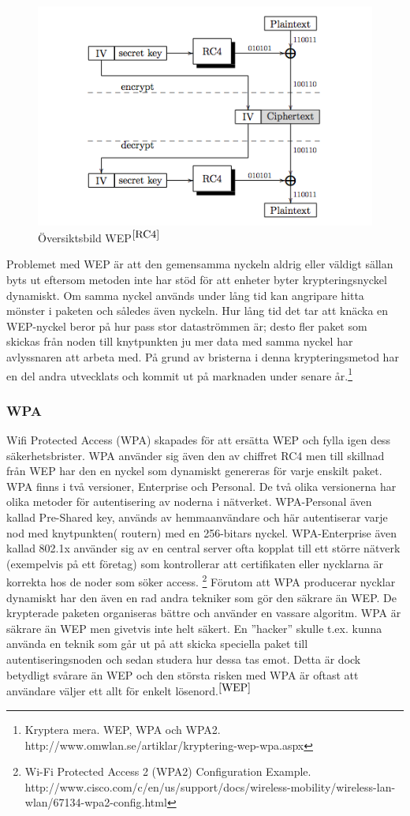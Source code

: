 \documentclass[a4paper,12pt,fleqn]{article}
\begin{document}
\begin{figure}[htp]
  \begin{center}
  \includegraphics[keepaspectratio=true,width=0.5\linewidth]{WEP}  %
  \caption{Översiktsbild WEP$^{\ref{RC4}}$} %
  \end{center}
  \label{fig:overview}
\end{figure}
\newpage
Problemet med WEP är att den gemensamma nyckeln aldrig eller väldigt sällan byts ut eftersom metoden inte har stöd för att enheter byter krypteringsnyckel dynamiskt. Om samma nyckel används under lång tid kan angripare hitta mönster i paketen och således även nyckeln. Hur lång tid det tar att knäcka en WEP-nyckel beror på hur pass stor dataströmmen är; desto fler paket som skickas från noden till knytpunkten ju mer data med samma nyckel har avlyssnaren att arbeta med. På grund av bristerna i denna krypteringsmetod har en del andra utvecklats och kommit ut på marknaden under senare år.\footnote{\label{WEP}Kryptera mera. WEP, WPA och WPA2. http://www.omwlan.se/artiklar/kryptering-wep-wpa.aspx }

\subsubsection{WPA}
Wifi Protected Access (WPA) skapades för att ersätta WEP och fylla igen dess säkerhetsbrister. WPA använder sig även den av chiffret RC4 men till skillnad från WEP har den en nyckel som dynamiskt genereras för varje enskilt paket. WPA finns i två versioner, Enterprise och Personal. De två olika versionerna har olika metoder för autentisering av noderna i nätverket. WPA-Personal även kallad Pre-Shared key, används av hemmaanvändare och här autentiserar varje nod med knytpunkten( routern) med en 256-bitars nyckel. WPA-Enterprise även kallad 802.1x använder sig av en central server ofta kopplat till ett större nätverk (exempelvis på ett företag) som kontrollerar att certifikaten eller nycklarna är korrekta hos de noder som söker access. \footnote{\label{WPA}Wi-Fi Protected Access 2 (WPA2) Configuration Example. http://www.cisco.com/c/en/us/support/docs/wireless-mobility/wireless-lan-wlan/67134-wpa2-config.html}
Förutom att WPA producerar nycklar dynamiskt har den även en rad andra tekniker som gör den säkrare än WEP. De krypterade paketen organiseras bättre och använder en vassare algoritm. WPA är säkrare än WEP men givetvis inte helt säkert. En ''hacker'' skulle t.ex. kunna använda en teknik som går ut på att skicka speciella paket till autentiseringsnoden och sedan studera hur dessa tas emot. Detta är dock betydligt svårare än WEP och den största risken med WPA är oftast att användare väljer ett allt för enkelt lösenord.$^{\ref{WEP}}$
\end{document}
